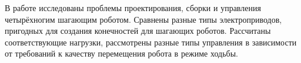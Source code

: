 
В работе исследованы проблемы проектирования, сборки и управления четырёхногим шагающим роботом. Сравнены разные типы электроприводов, пригодных для создания конечностей для шагающих роботов. Рассчитаны соответствующие нагрузки, рассмотрены разные типы управления в зависимости от требований к качеству перемещения робота в режиме ходьбы. 


